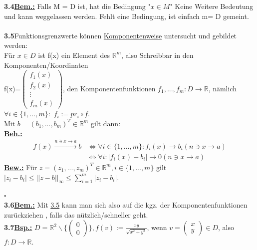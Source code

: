 \documentclass[]{scrartcl}
\begin{document}
	\textbf{3.4\underline{Bem.:}} Falls M = D ist, hat die Bedingung "$x\in M$" Keine Weitere Bedeutung und kann weggelassen werden. Fehlt eine Bedingung, ist einfach m= D gemeint.\\\\
	
	\textbf{3.5}Funktionsgrenzwerte können \underline{Komponentenweise} untersucht und gebildet werden:\\
	Für $ x \in D$ ist f(x) ein Element des $\mathbb{R}^m$, also Schreibbar in den Komponenten/Koordinaten\\
	f(x)=$\begin{pmatrix}
		f_1(x)\\f_2(x)\\\vdots\\ f_m(x)
	\end{pmatrix}$, den Komponentenfunktionen $f_1,...,f_m: D\rightarrow\mathbb{R}$, nämlich $\forall i \in \{1,...,m\}:$  \ul{$f_i:=pr_i\circ f$}.\\
	Mit $b= (b_1,...,b_m)^T \in \mathbb{R}^m$ gilt dann:\\
	\textbf{\underline{Beh.:}} \begin{equation}\begin{split}
		f(x)\xrightarrow{n\ni x \rightarrow a}b & \Leftrightarrow \forall i \in \{1,...,m\}: f_i (x)\rightarrow b_i (n\ni x\rightarrow a)\\
		 & \Leftrightarrow\forall i: |f_i(x)-b_i|\rightarrow0(n\ni x \rightarrow a)
		\end{split}
	\end{equation} 
	\textbf{\underline{Bew.:}} Für $z= (z_1,...,z_m)^T \in \mathbb{R}^m, i\in \{1,...,m\}$ gilt $|z_i-b_i|\leq||z-b||_\infty \leq \sum_{i=1}^{m}|z_i-b_i|.$\\
	\strut\hfill $\square$\\
	\textbf{3.6\underline{Bem.:}} Mit  \ul{3.5} kann man sich also auf die kgz. der Komponentenfunktionen zurückziehen , falls das nützlich/schneller geht.\\
	\textbf{3.7\underline{Bsp.:}} $D = \mathbb{R}^2 \backslash\{\begin{pmatrix}0\\0\end{pmatrix}\}, f(v):=\frac{xy}{\sqrt{x^2+y^2}}$, wenn $v=\begin{pmatrix}x\\y\end{pmatrix} \in D$, also $f:D\rightarrow\mathbb{R}$.\\
\end{document}
